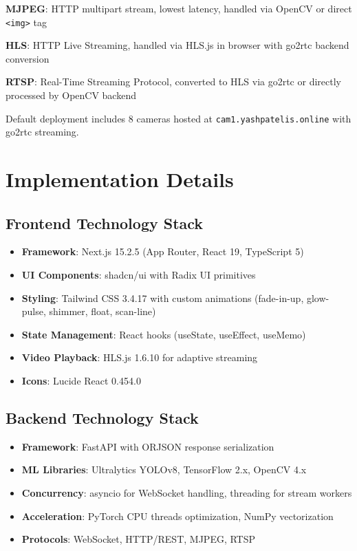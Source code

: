 \documentclass[conference]{IEEEtran}
\begin{document}
\textbf{MJPEG}: HTTP multipart stream, lowest latency, handled via OpenCV or direct \texttt{<img>} tag

\textbf{HLS}: HTTP Live Streaming, handled via HLS.js in browser with go2rtc backend conversion

\textbf{RTSP}: Real-Time Streaming Protocol, converted to HLS via go2rtc or directly processed by OpenCV backend

Default deployment includes 8 cameras hosted at \texttt{cam1.yashpatelis.online} with go2rtc streaming.

\section{Implementation Details}

\subsection{Frontend Technology Stack}
\begin{itemize}
    \item \textbf{Framework}: Next.js 15.2.5 (App Router, React 19, TypeScript 5)
    \item \textbf{UI Components}: shadcn/ui with Radix UI primitives
    \item \textbf{Styling}: Tailwind CSS 3.4.17 with custom animations (fade-in-up, glow-pulse, shimmer, float, scan-line)
    \item \textbf{State Management}: React hooks (useState, useEffect, useMemo)
    \item \textbf{Video Playback}: HLS.js 1.6.10 for adaptive streaming
    \item \textbf{Icons}: Lucide React 0.454.0
\end{itemize}

\subsection{Backend Technology Stack}
\begin{itemize}
    \item \textbf{Framework}: FastAPI with ORJSON response serialization
    \item \textbf{ML Libraries}: Ultralytics YOLOv8, TensorFlow 2.x, OpenCV 4.x
    \item \textbf{Concurrency}: asyncio for WebSocket handling, threading for stream workers
    \item \textbf{Acceleration}: PyTorch CPU threads optimization, NumPy vectorization
    \item \textbf{Protocols}: WebSocket, HTTP/REST, MJPEG, RTSP
\end{itemize}
\end{document}
